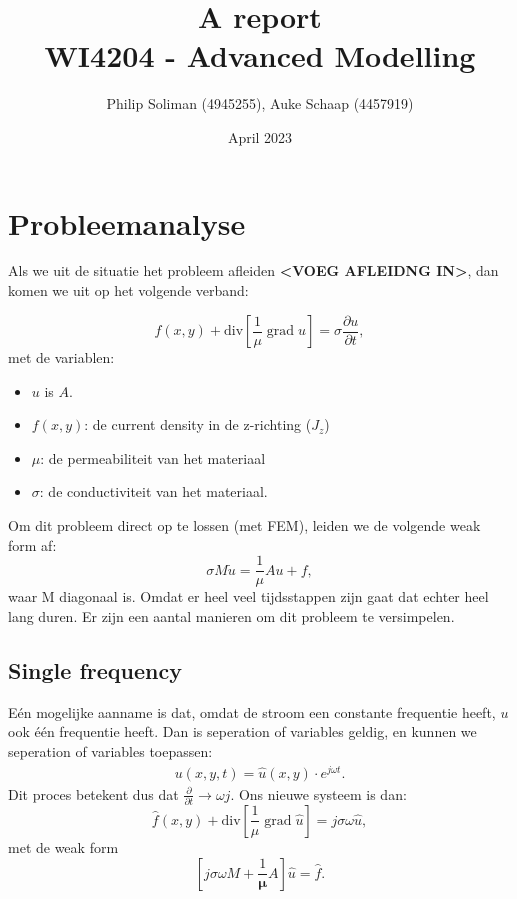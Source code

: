 \documentclass[11pt]{article}
\title{%
    A report \\
    \large WI4204 - Advanced Modelling
}
\author{Philip Soliman (4945255), Auke Schaap (4457919)}
\date{April 2023}
\begin{document}
\maketitle


\section{Probleemanalyse}
Als we uit de situatie het probleem afleiden \textbf{<VOEG AFLEIDNG IN>}, dan komen we uit op het volgende verband:

\begin{equation}
    f(x,y)+\text{div}\left[\frac{1}{\mu} \;\text{grad}\;u\right] = \sigma \frac{\partial u}{\partial t},
\end{equation}
met de variablen:
\begin{itemize}
    \item $u$ is $A$.
    \item $f(x,y)$: de current density in de z-richting ($J_z$) 
    \item $\mu$: de permeabiliteit van het materiaal
    \item $\sigma$: de conductiviteit van het materiaal.
\end{itemize}

Om dit probleem direct op te lossen (met FEM), leiden we de volgende weak form af:
\begin{equation*}
    \sigma M \dot u = \frac{1}{\mu}A u + f,
\end{equation*}
waar M diagonaal is. Omdat er heel veel tijdsstappen zijn gaat dat echter heel lang duren. Er zijn een aantal manieren om dit probleem te versimpelen.

\subsection{Single frequency}
Eén mogelijke aanname is dat, omdat de stroom een constante frequentie heeft, $u$ ook één frequentie heeft. Dan is seperation of variables geldig, en kunnen we seperation of variables toepassen:
\begin{align*}
    u(x,y,t) = \hat u(x,y) \cdot e^{j\omega t}.
\end{align*}
Dit proces betekent dus dat $\frac{\partial}{\partial t} \to \omega j$. Ons nieuwe systeem is dan:
\begin{equation*}
    \hat f(x,y)+\text{div}\left[\frac{1}{\mu} \;\text{grad}\;\hat u\right] = j\sigma \omega \hat u,
\end{equation*}
met de weak form
\begin{equation*}
    \left[j\sigma \omega M + \frac{1}{\mathbf \mu}A\right]\hat u = \hat f.
\end{equation*}
\end{document}
